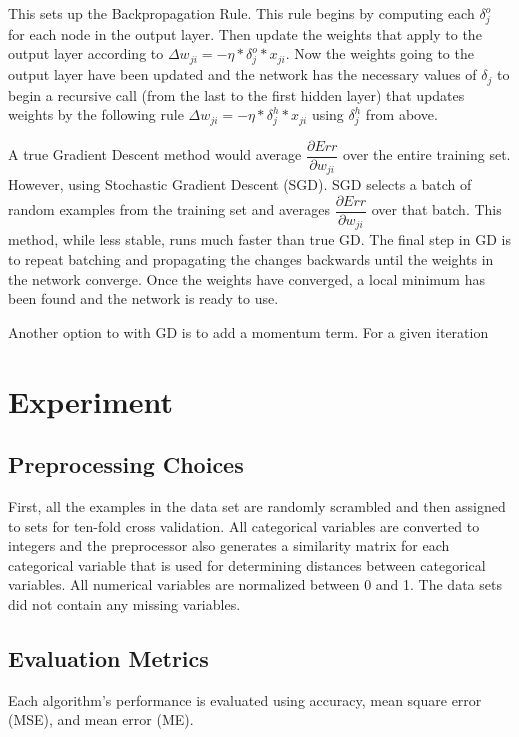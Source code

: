 \documentclass[twoside,11pt]{article}
\begin{document}
This sets up the Backpropagation Rule. This rule begins by computing each $\delta _j^o$ for each node in the output layer. Then update the weights that apply to the output layer according to 
$\Delta w_{ji} = - \eta * \delta _j^o * x_{ji}$.
Now the weights going to the output layer have been updated and the network has the necessary values of $\delta _j$ to begin a recursive call (from the last to the first hidden layer) that updates weights by the following rule
$\Delta w_{ji} = - \eta * \delta _j^h * x_{ji}$ using $\delta _j^h$ 
from above.

A true Gradient Descent method would average $\dfrac{\partial Err}{\partial w_{ji}}$ over the entire training set. However, using Stochastic Gradient Descent (SGD). SGD selects a batch of random examples from the training set and averages $\dfrac{\partial Err}{\partial w_{ji}}$ over that batch. This method, while less stable, runs much faster than true GD.
The final step in GD is to repeat batching and propagating the changes backwards until the weights in the network converge. Once the weights have converged, a local minimum has been found and the network is ready to use.

Another option to with GD is to add a momentum term. For a given iteration 

\section{Experiment}

\subsection{Preprocessing Choices}
First, all the examples in the data set are randomly scrambled and then assigned to sets
for ten-fold cross validation. All categorical variables are converted to integers and the
preprocessor also generates a similarity matrix for each categorical variable that is used for
determining distances between categorical variables. All numerical variables are normalized
between 0 and 1. The data sets did not contain any missing variables.

\subsection{Evaluation Metrics}
Each algorithm's performance is evaluated using accuracy, mean square error (MSE), and mean error (ME).
\end{document}
